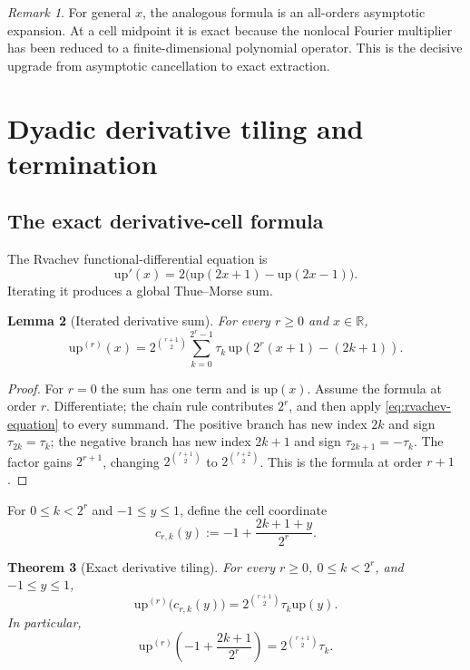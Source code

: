 \documentclass[11pt,oneside]{article}
\numberwithin{equation}{section}
\newtheorem{theorem}{Theorem}[section]
\newtheorem{lemma}[theorem]{Lemma}
\theoremstyle{definition}
\theoremstyle{remark}
\newtheorem{remark}[theorem]{Remark}
\newcommand{\R}{\mathbb{R}}
\newcommand{\upf}{\mathrm{up}}
\newcommand{\TM}{\tau}
\begin{document}
\begin{remark}
For general $x$, the analogous formula is an all-orders asymptotic expansion.
At a cell midpoint it is exact because the nonlocal Fourier multiplier has been
reduced to a finite-dimensional polynomial operator.  This is the decisive
upgrade from asymptotic cancellation to exact extraction.
\end{remark}

\section{Dyadic derivative tiling and termination}

\subsection{The exact derivative-cell formula}

The Rvachev functional-differential equation is
\begin{equation}
 \upf'(x)=2\bigl(\upf(2x+1)-\upf(2x-1)\bigr).
 \label{eq:rvachev-equation}
\end{equation}
Iterating it produces a global Thue--Morse sum.

\begin{lemma}[Iterated derivative sum]
For every $r\ge0$ and $x\in\R$,
\begin{equation}
 \upf^{(r)}(x)=2^{\binom{r+1}{2}}
 \sum_{k=0}^{2^r-1}\TM_k\,
 \upf\!\left(2^r(x+1)-(2k+1)\right).
 \label{eq:global-derivative-sum}
\end{equation}
\end{lemma}

\begin{proof}
For $r=0$ the sum has one term and is $\upf(x)$.  Assume the formula at order
$r$.  Differentiate; the chain rule contributes $2^r$, and then apply
\eqref{eq:rvachev-equation} to every summand.  The positive branch has new index
$2k$ and sign $\TM_{2k}=\TM_k$; the negative branch has new index $2k+1$ and sign
$\TM_{2k+1}=-\TM_k$.  The factor gains $2^{r+1}$, changing
$2^{\binom{r+1}{2}}$ to $2^{\binom{r+2}{2}}$.  This is the formula at order
$r+1$.
\end{proof}

For $0\le k<2^r$ and $-1\le y\le1$, define the cell coordinate
\begin{equation}
 c_{r,k}(y):=-1+\frac{2k+1+y}{2^r}.
 \label{eq:cell-coordinate}
\end{equation}

\begin{theorem}[Exact derivative tiling]
For every $r\ge0$, $0\le k<2^r$, and $-1\le y\le1$,
\begin{equation}
 \boxed{\displaystyle
 \upf^{(r)}\bigl(c_{r,k}(y)\bigr)
 =2^{\binom{r+1}{2}}\TM_k\upf(y).}
 \label{eq:derivative-tiling}
\end{equation}
In particular,
\begin{equation}
 \upf^{(r)}\!\left(-1+\frac{2k+1}{2^r}\right)
 =2^{\binom{r+1}{2}}\TM_k.
 \label{eq:derivative-midpoint}
\end{equation}
\end{theorem}
\end{document}
